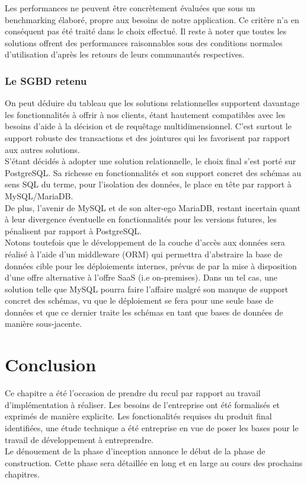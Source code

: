 \begin{spacing}{1.5}
Les performances ne peuvent être concrètement évaluées que sous un benchmarking élaboré, propre aux besoins de notre application. Ce critère n’a en conséquent pas été traité dans le choix effectué. Il reste à noter que toutes les solutions offrent des performances raisonnables sous des conditions normales d'utilisation d’après les retours de leurs communautés respectives.

\subsubsection{Le SGBD retenu}%
On peut déduire du tableau que les solutions relationnelles supportent davantage les fonctionnalités à offrir à nos clients, étant hautement compatibles avec les besoins d’aide à la décision et de requêtage multidimensionnel. C’est surtout le support robuste des transactions et des jointures qui les favorisent par rapport aux autres solutions.\\
S'étant décidés à adopter une solution relationnelle, le choix final s’est porté sur PostgreSQL. Sa richesse en fonctionnalités et son support concret des schémas au sens SQL du terme, pour l’isolation des données, le place en tête par rapport à MySQL/MariaDB.\\
De plus, l’avenir de MySQL et de son alter-ego MariaDB, restant incertain quant à leur divergence éventuelle en fonctionnalités pour les versions futures, les pénalisent par rapport à PostgreSQL.\\
Notons toutefois que le développement de la couche d’accès aux données sera réalisé à l’aide d’un middleware (ORM) qui permettra d’abstraire la base de données cible pour les déploiements internes, prévus de par la mise à disposition d’une offre alternative à l’offre SaaS (i.e on-premises). Dans un tel cas, une solution telle que MySQL pourra faire l’affaire malgré son manque de support concret des schémas, vu que le déploiement se fera pour une seule base de données et que ce dernier traite les schémas en tant que bases de données de manière sous-jacente.


\section*{Conclusion}
Ce chapitre a été l'occasion de prendre du recul par rapport au travail d'implémentation à réaliser. Les besoins de l'entreprise ont été formalisés et exprimés de manière explicite. Les fonctionalités requises du produit final identifiées, une étude technique a été entreprise en vue de poser les bases pour le travail de développement à entreprendre.\\
Le dénouement de la phase d'inception annonce le début de la phase de construction. Cette phase sera détaillée en long et en large au cours des prochains chapitres.

\end{spacing}
